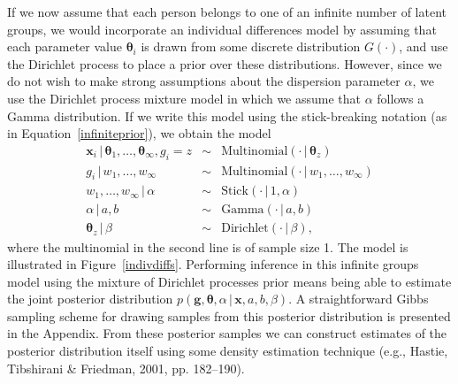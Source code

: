 \documentclass[authoryear]{elsarticle}
\newcommand{\condon}{\,|\,}
\newcommand{\vctr}[1]{\bm{#1}}
\begin{document}
If we now assume that each person belongs to one of an infinite number of
latent groups, we would incorporate an individual differences model by assuming
that each parameter value $\vctr{\theta}_i$ is drawn from some
discrete distribution $G(\cdot)$, and use the Dirichlet process to place a
prior over these distributions. However, since we do not wish to make strong
assumptions about the dispersion parameter $\alpha$, we use the Dirichlet process
mixture model in which we assume that $\alpha$ follows a
Gamma distribution. If we write this model using the stick-breaking
notation (as in Equation~\ref{infiniteprior}), we obtain the model
\begin{equation}
        \begin{array}{rcl}
        \vctr{x}_{i} \condon \vctr{\theta}_1, \ldots, \vctr{\theta}_\infty, g_i=z
        & \sim & \mbox{Multinomial}(\cdot \condon \vctr{\theta}_z) \\
        g_i \condon w_1, \ldots, w_\infty & \sim &
        \mbox{Multinomial}(\cdot \condon w_1, \ldots, w_\infty) \\
        w_1, \ldots, w_\infty \condon \alpha & \sim &
        \mbox{Stick}(\cdot \condon 1,\alpha) \\
        \alpha \condon a, b & \sim & \mbox{Gamma}(\cdot \condon a,b)\\
        \vctr{\theta}_z \condon \beta & \sim & \mbox{Dirichlet}(\cdot \condon\beta),
       \end{array}
        \label{idg}
\end{equation}
where the multinomial in the second line is of sample size 1.
The model is illustrated in
Figure~\ref{indivdiffs}. Performing inference in this infinite groups model
using the mixture of Dirichlet processes prior means being able to estimate
the joint posterior distribution $p(\vctr{g}, \vctr{\theta}, \alpha \condon
\vctr{x}, a, b, \beta)$. A straightforward Gibbs sampling scheme for drawing
samples from this posterior distribution is presented in the Appendix.
From these posterior samples we can construct estimates of the posterior
distribution itself using some density estimation technique (e.g.,
Hastie, Tibshirani \& Friedman, 2001, pp. 182--190).
\end{document}
